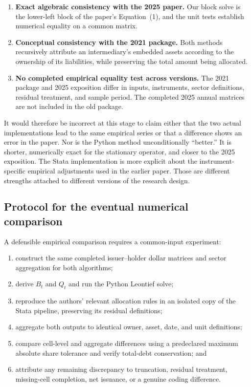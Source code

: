\documentclass[11pt]{article}
\begin{document}
\begin{enumerate}
  \item \textbf{Exact algebraic consistency with the 2025 paper.} Our block
        solve is the lower-left block of the paper's Equation~(1), and the unit
        tests establish numerical equality on a common matrix.
  \item \textbf{Conceptual consistency with the 2021 package.} Both methods
        recursively attribute an intermediary's embedded assets according to the
        ownership of its liabilities, while preserving the total amount being
        allocated.
  \item \textbf{No completed empirical equality test across versions.} The
        2021 package and 2025 exposition differ in inputs, instruments, sector
        definitions, residual treatment, and sample period. The completed 2025
        annual matrices are not included in the old package.
\end{enumerate}

It would therefore be incorrect at this stage to claim either that the two
actual implementations lead to the same empirical series or that a difference
shows an error in the paper. Nor is the Python method unconditionally
``better.'' It is shorter, numerically exact for the stationary operator, and
closer to the 2025 exposition. The Stata implementation is more explicit about
the instrument-specific empirical adjustments used in the earlier paper.
Those are different strengths attached to different versions of the research
design.

\subsection{Protocol for the eventual numerical comparison}

A defensible empirical comparison requires a common-input experiment:

\begin{enumerate}
  \item construct the same completed issuer--holder dollar matrices and sector
        aggregation for both algorithms;
  \item derive $B_t$ and $Q_t$ and run the Python Leontief solve;
  \item reproduce the authors' relevant allocation rules in an isolated copy
        of the Stata pipeline, preserving its residual definitions;
  \item aggregate both outputs to identical owner, asset, date, and unit
        definitions;
  \item compare cell-level and aggregate differences using a predeclared
        maximum absolute share tolerance and verify total-debt conservation; and
  \item attribute any remaining discrepancy to truncation, residual treatment,
        missing-cell completion, net issuance, or a genuine coding difference.
\end{enumerate}
\end{document}
